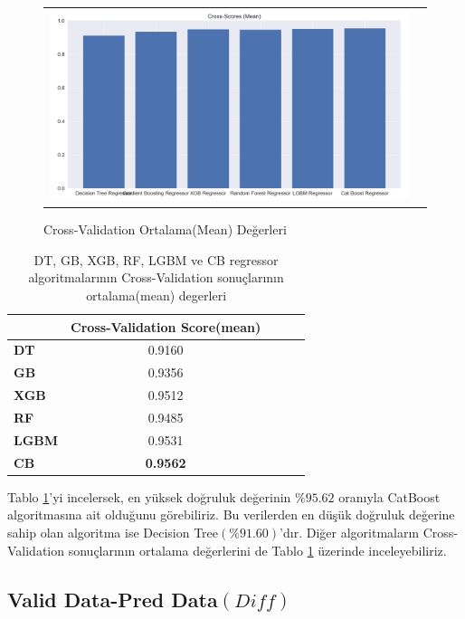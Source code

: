 \documentclass[conference]{IEEEtran}
\begin{document}
\begin{figure}[!h]
	\centering
	\begin{center}
		\begin{tabular}{cc}
			\includegraphics[scale=0.2]{pictures/pic_16.png}&
		\end{tabular}
	\end{center}
	\caption{Cross-Validation Ortalama(Mean) Değerleri}
	\label{fig:16}
\end{figure}
\pagebreak
\begin{table}[h]
	\centering
	\normalsize
	\begin{tabular}{|l|c|c|c|c|}
		\hline
					& \textbf{Cross-Validation Score(mean)}	\\ \hline
		\textbf{DT}		& 0.9160		\\ \hline
		\textbf{GB}		& 0.9356		\\ \hline
		\textbf{XGB}		& 0.9512		\\ \hline
		\textbf{RF}		& 0.9485		\\ \hline
		\textbf{LGBM}	& 0.9531		\\ \hline
		\textbf{CB}		& \textbf{0.9562}	\\ \hline
	\end{tabular}
	\caption{DT, GB, XGB, RF, LGBM ve CB regressor algoritmalarının Cross-Validation sonuçlarının ortalama(mean) degerleri}
	\label{tbl:02}
\end{table}

\quad Tablo \ref{tbl:02}'yi incelersek, en yüksek doğruluk değerinin $\%95.62$ oranıyla CatBoost algoritmasına ait olduğunu görebiliriz. Bu verilerden en düşük doğruluk değerine sahip olan algoritma ise Decision Tree$(\%91.60)$'dır. Diğer algoritmaların Cross-Validation sonuçlarının ortalama değerlerini de Tablo \ref{tbl:02} üzerinde inceleyebiliriz.

\subsection{\textbf{Valid Data-Pred Data$(Diff)$}}
\end{document}
